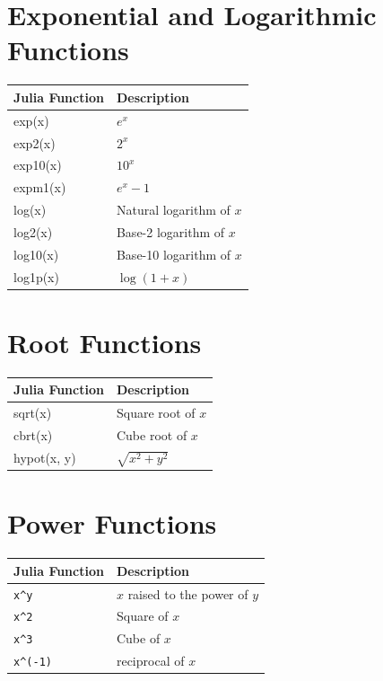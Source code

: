 \documentclass[12pt,answers]{book}
\begin{document}
\section{Exponential and Logarithmic Functions}
\begin{tabular}{>{\ttfamily}l l}
  \toprule
  \textbf{Julia Function} & \textbf{Description} \\
  \midrule
  exp(x) & $e^x$ \\
  exp2(x) & $2^x$ \\
  exp10(x) & $10^x$ \\
  expm1(x) & $e^x - 1$ \\
  log(x) & Natural logarithm of $x$ \\
  log2(x) & Base-2 logarithm of $x$ \\
  log10(x) & Base-10 logarithm of $x$ \\
  log1p(x) & $\log(1+x)$ \\
  \bottomrule
\end{tabular}

\section{Root Functions}
\begin{tabular}{>{\ttfamily}l l}
  \toprule
  \textbf{Julia Function} & \textbf{Description} \\
  \midrule
  sqrt(x) & Square root of $x$ \\
  cbrt(x) & Cube root of $x$ \\
  hypot(x, y) & $\sqrt{x^2 + y^2}$ \\
  \bottomrule
\end{tabular}

\section{Power Functions}
\begin{tabular}{>{\ttfamily}l l}
  \toprule
  \textbf{Julia Function} & \textbf{Description} \\
  \midrule
  \verb|x^y| & $x$ raised to the power of $y$ \\
  \verb|x^2| & Square of $x$ \\
  \verb|x^3| & Cube of $x$ \\
  \verb|x^(-1)| & reciprocal of $x$ \\
  \bottomrule
\end{tabular}
\end{document}
